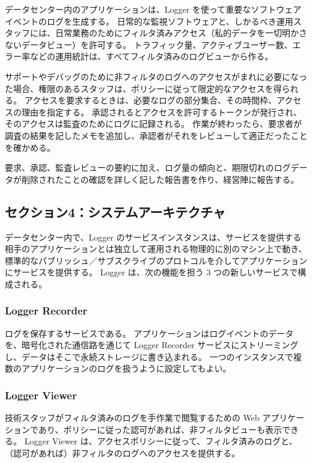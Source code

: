 \documentclass[uplatex]{jsarticle}
\begin{document}
データセンター内のアプリケーションは、Logger を使って重要なソフトウェアイベントのログを生成する。
日常的な監視ソフトウェアと、しかるべき運用スタッフには、日常業務のためにフィルタ済みアクセス（私的データを一切明かさないデータビュー）を許可する。
トラフィック量、アクティブユーザー数、エラー率などの運用統計は、すべてフィルタ済みのログビューから作る。

サポートやデバッグのために非フィルタのログへのアクセスがまれに必要になった場合、権限のあるスタッフは、ポリシーに従って限定的なアクセスを得られる。
アクセスを要求するときは、必要なログの部分集合、その時間枠、アクセスの理由を指定する。
承認されるとアクセスを許可するトークンが発行され、そのアクセスは監査のためにログに記録される。
作業が終わったら、要求者が調査の結果を記したメモを追加し、承認者がそれをレビューして適正だったことを確かめる。

要求、承認、監査レビューの要約に加え、ログ量の傾向と、期限切れのログデータが削除されたことの確認を詳しく記した報告書を作り、経営陣に報告する。

\subsection{セクション4：システムアーキテクチャ}

データセンター内で、Logger のサービスインスタンスは、サービスを提供する相手のアプリケーションとは独立して運用される物理的に別のマシン上で動き、標準的なパブリッシュ／サブスクライブのプロトコルを介してアプリケーションにサービスを提供する。
Logger は、次の機能を担う 3 つの新しいサービスで構成される。

\subsubsection{Logger Recorder}

ログを保存するサービスである。
アプリケーションはログイベントのデータを、暗号化された通信路を通じて Logger Recorder サービスにストリーミングし、データはそこで永続ストレージに書き込まれる。
一つのインスタンスで複数のアプリケーションのログを扱うように設定してもよい。

\subsubsection{Logger Viewer}

技術スタッフがフィルタ済みのログを手作業で閲覧するための Web アプリケーションであり、ポリシーに従った認可があれば、非フィルタビューも表示できる。
Logger Viewer は、アクセスポリシーに従って、フィルタ済みのログと、（認可があれば）非フィルタのログへのアクセスを提供する。
\end{document}

